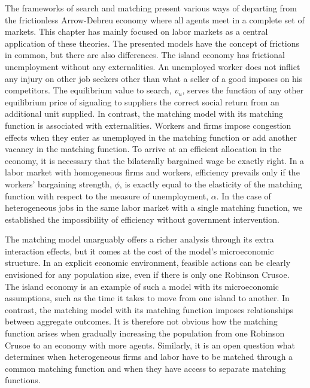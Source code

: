 The frameworks of search and matching present various ways of departing
from the frictionless Arrow-Debreu economy where all agents meet in
a complete set of markets. This chapter has mainly focused on labor markets
as a central application of these theories. The presented models have
the concept of frictions in common, but there are also differences.
The island economy has frictional unemployment without any externalities.
An unemployed worker does not inflict any injury
on other job seekers other than what a seller of a good imposes on his
competitors. The equilibrium value to search, $v_u$, serves the function
of any other equilibrium price of signaling to suppliers the correct
social return from an additional unit supplied. In contrast, the matching
model with its matching function is
associated with externalities. Workers and firms impose
congestion effects when they enter as unemployed
in the matching function or add another vacancy in the matching
function. To arrive at an efficient allocation in the economy, it is
necessary that the bilaterally bargained wage be exactly right.
In a labor market with homogeneous firms and workers,
efficiency prevails only if the workers' bargaining strength,
$\phi$, is exactly equal to the elasticity of the matching function
with respect to the measure of unemployment, $\alpha$. In the case of
heterogeneous jobs in the same labor market with a single matching
function, we established the impossibility of efficiency without
government intervention.

The matching model unarguably offers  a richer analysis through its
extra interaction effects, but it comes at the cost of the model's
microeconomic structure. In an explicit economic environment,
feasible actions can be clearly envisioned
for any population size, even if there is only one Robinson Crusoe.
The island economy is an example of such a model with its
microeconomic assumptions,
such as the time it takes to move from one island to another.
In contrast, the matching model with its matching function imposes
relationships between aggregate outcomes. It is therefore not
obvious how the matching function arises when gradually increasing
the population from one Robinson Crusoe to an economy with more
agents. Similarly, it is an open question what
determines when heterogeneous firms and labor have to be matched through
a common matching function and when they have access to
separate matching functions.

